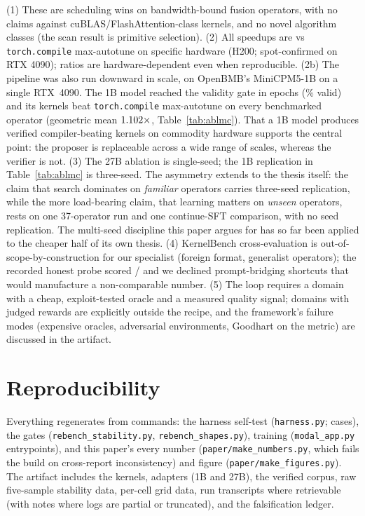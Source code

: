 \documentclass[10pt]{article}
\newcommand{\maxauto}{\texttt{torch.compile} max-autotune}
\begin{document}
(1) These are scheduling wins on bandwidth-bound fusion operators, with no claims against
cuBLAS/FlashAttention-class kernels, and no novel algorithm classes (the scan result is
primitive selection). (2) All speedups are vs \maxauto{} on specific hardware
(H200; spot-confirmed on RTX 4090); ratios are hardware-dependent even when reproducible.
(2b) The pipeline was also run downward in scale, on OpenBMB's MiniCPM5-1B on a single
RTX~4090. The 1B model reached the validity gate in \mcSftEpochs{} epochs (\mcSftValid\%
valid) and its kernels beat \maxauto{} on every benchmarked operator (geometric mean
$1.102\times$, Table~\ref{tab:ablmc}). That a 1B model produces verified
compiler-beating kernels on commodity hardware supports the central point: the proposer is
replaceable across a wide range of scales, whereas the verifier is not.
(3) The 27B ablation is single-seed; the 1B replication in Table~\ref{tab:ablmc} is
three-seed. The asymmetry extends to the thesis itself: the claim that search dominates on
\emph{familiar} operators carries three-seed replication, while the more load-bearing claim,
that learning matters on \emph{unseen} operators, rests on one 37-operator run and one
continue-SFT comparison, with no seed replication. The multi-seed discipline this paper
argues for has so far been applied to the cheaper half of its own thesis.
(4) KernelBench cross-evaluation is
out-of-scope-by-construction for our specialist (foreign format, generalist operators);
the recorded honest probe scored \kbCorrect/\kbN{} and we declined prompt-bridging
shortcuts that would manufacture a non-comparable number. (5) The loop requires a domain
with a cheap, exploit-tested oracle and a measured quality signal; domains with judged
rewards are explicitly outside the recipe, and the framework's failure modes (expensive
oracles, adversarial environments, Goodhart on the metric) are discussed in the artifact.

\section{Reproducibility}

Everything regenerates from commands: the harness self-test
(\texttt{harness.py}; \selftestCasesHTwoHundred{} cases), the gates
(\texttt{rebench\_stability.py}, \texttt{rebench\_shapes.py}), training
(\texttt{modal\_app.py} entrypoints), and this paper's every number
(\texttt{paper/make\_numbers.py}, which fails the build on cross-report inconsistency)
and figure (\texttt{paper/make\_figures.py}). The artifact includes the
\productKernels{} kernels, adapters (1B and 27B), the verified corpus, raw five-sample
stability data, per-cell grid data, run transcripts where retrievable (with notes where
logs are partial or truncated), and the falsification ledger.
\end{document}
